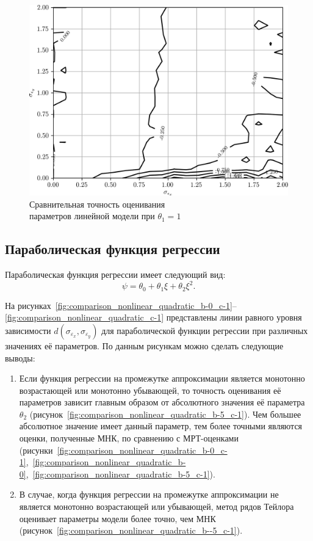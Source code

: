 \begin{figure}[h]
  \centering
  \includegraphics[width=135mm]{fig/nonlinear/linear/a-0_b-1.png}
  \caption{
    Сравнительная точность оценивания \\
    параметров линейной модели при \( \theta_1 = 1 \)
  }\label{fig:comparison_nonlinear_linear}
\end{figure}

\vspace{2\baselineskip}
\subsection{Параболическая функция регрессии}

Параболическая функция регрессии имеет следующий вид:
\[ \psi = \theta_0 + \theta_1 \xi + \theta_2 \xi^2. \]

На рисунках~\ref{fig:comparison_nonlinear_quadratic_b-0_c-1}--\ref{fig:comparison_nonlinear_quadratic_c-1} представлены линии равного уровня зависимости
\( d(\sigma_{\varepsilon_x}, \sigma_{\varepsilon_y}) \)
для параболической функции регрессии при различных значениях её параметров.
По данным рисункам можно сделать следующие выводы:
\begin{enumerate}
\item Если функция регрессии на промежутке аппроксимации является монотонно
  возрастающей или монотонно убывающей,
  то точность оценивания её параметров зависит главным образом от
  абсолютного значения её параметра \( \theta_2 \)
  (рисунок~\ref{fig:comparison_nonlinear_quadratic_b-5_c-1}).
  Чем большее абсолютное значение имеет данный параметр,
  тем более точными являются оценки, полученные МНК,
  по сравнению с МРТ-оценками
  (рисунки~\ref{fig:comparison_nonlinear_quadratic_b-0_c-1},~\ref{fig:comparison_nonlinear_quadratic_b-0},~\ref{fig:comparison_nonlinear_quadratic_b-5_c-1}).
\item В случае, когда функция регрессии на промежутке аппроксимации не является
  монотонно возрастающей или убывающей,
  метод рядов Тейлора оценивает параметры модели более точно, чем МНК
  (рисунок~\ref{fig:comparison_nonlinear_quadratic_b--5_c-1}).
\end{enumerate}

